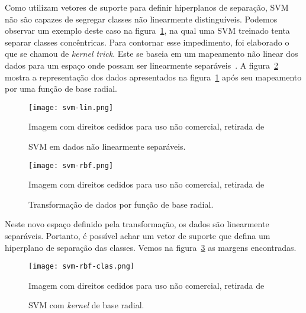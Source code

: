 Como utilizam vetores de suporte para definir hiperplanos de separação, SVM não são capazes de segregar classes não
linearmente distinguíveis.
Podemos observar um exemplo deste caso na figura~\ref{fig:svm-lin}, na qual uma SVM treinado tenta separar classes
concêntricas.
Para contornar esse impedimento, foi elaborado o que se chamou de \textit{kernel trick}.
Este se baseia em um mapeamento não linear dos dados para um espaço onde possam ser linearmente
separáveis~\cite{scholkopf02}.
A figura~\ref{fig:svm-rbf} mostra a representação dos dados apresentados na figura~\ref{fig:svm-lin} após seu mapeamento
por uma função de base radial.

\begin{figure}
\begin{center} {
    \begin{center}
    \texttt{[image: svm-lin.png]}
    \caption{SVM em dados não linearmente separáveis.}
    \small Imagem com direitos cedidos para uso não comercial, retirada de~\cite{vanderplas15}
    \label{fig:svm-lin}
    \end{center}
}
\end{center}
\end{figure}

\begin{figure}
\begin{center} {
    \begin{center}
    \texttt{[image: svm-rbf.png]}
    \caption{Transformação de dados por função de base radial.}
    \small Imagem com direitos cedidos para uso não comercial, retirada de~\cite{vanderplas15}
    \label{fig:svm-rbf}
    \end{center}
}
\end{center}
\end{figure}

Neste novo espaço definido pela transformação, os dados são linearmente separáveis.
Portanto, é possível achar um vetor de suporte que defina um hiperplano de separação das classes.
Vemos na figura~\ref{fig:svm-rbf-clas} as margens encontradas.

\begin{figure}
\begin{center} {
    \begin{center}
    \texttt{[image: svm-rbf-clas.png]}
    \caption{SVM com \textit{kernel} de base radial.}
    \small Imagem com direitos cedidos para uso não comercial, retirada de~\cite{vanderplas15}
    \label{fig:svm-rbf-clas}
    \end{center}
}
\end{center}
\end{figure}

